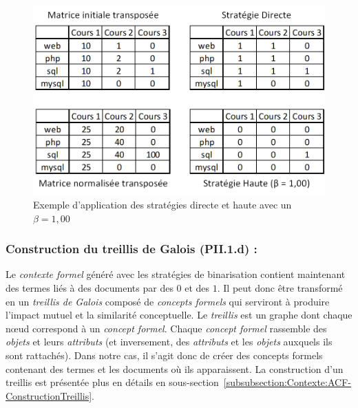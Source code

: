 \begin{figure}[ht]
\centering
\centerline{  %
\includegraphics[scale=1]{3-Methode-CREA/images/2-analyse-structurelle/exemple_strategies_directe_haute_beta=1.00.png}
}
\caption{Exemple d'application des stratégies directe et haute avec un $ \beta = 1,00 $}
\label{figure:3-II-1-c-Strategies-Exemple-Directe-Haute}
\end{figure}



\subsubsection{Construction du treillis de Galois (PII.1.d) :}
\label{subsubsection:CREA:PII.1.d-treillis}

Le \textit{contexte formel} généré avec les stratégies de binarisation contient maintenant des termes liés à des documents par des $ 0 $ et des $ 1 $.
Il peut donc être transformé en un \textit{treillis de Galois} composé de \textit{concepts formels} qui serviront à produire l'impact mutuel et la similarité conceptuelle.
Le \textit{treillis} est un graphe dont chaque n\oe{}ud correspond à un \textit{concept formel}.
Chaque \textit{concept formel} rassemble des \textit{objets} et leurs \textit{attributs} (et inversement, des \textit{attributs} et les \textit{objets} auxquels ils sont rattachés).
Dans notre cas, il s'agit donc de créer des concepts formels contenant des termes et les documents où ils apparaissent.
La construction d'un treillis est présentée plus en détails en sous-section~\ref{subsubsection:Contexte:ACF-ConstructionTreillis}.

